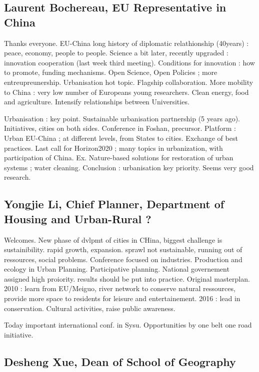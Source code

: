\subsection*{Laurent Bochereau, EU Representative in China}

Thanks everyone. EU-China long history of diplomatic relathionship (40years) : peace, economy, people to people. Science a bit later, recently upgraded : innovation cooperation (last week third meeting). Conditions for innovation : how to promote, funding mechanisms. Open Science, Open Policies ; more entreupreunership. Urbanisation hot topic. Flagship collaboration. More mobility to China : very low number of Europeans young researchers. Clean energy, food and agriculture. Intensify relationships between Universities.

Urbanisation : key point. Sustainable urbanisation partnership (5 years ago). Initiatives, cities on both sides. Conference in Foshan, precursor. Platform : Urban EU-China ; at different levels, from States to cities. Exchange of best practices. Last call for Horizon2020 ; many topics in urbanization, with participation of China. Ex. Nature-based solutions for restoration of urban systems ; water cleaning. Conclusion : urbanisation key priority. Seems very good research.

\subsection*{Yongjie Li, Chief Planner, Department of Housing and Urban-Rural ?}

Welcomes. New phase of dvlpmt of cities in CHina, biggest challenge is sustainibility. rapid growth, expansion. sprawl not sustainable, running out of ressources, social problems. Conference focused on industries. Production and ecology in Urban Planning. Participative planning. National governement assigned high proiority. results should be put into practice. Original masterplan. 2010 : learn from EU/Meiguo, river network to conserve natural ressources, provide more space to residents for leisure and entertainement. 2016 : lead in conservation. Cultural activities, raise public awareness. 

Today important international conf. in Sysu. Opportunities by one belt one road initiative. 



\subsection*{Desheng Xue, Dean of School of Geography}

